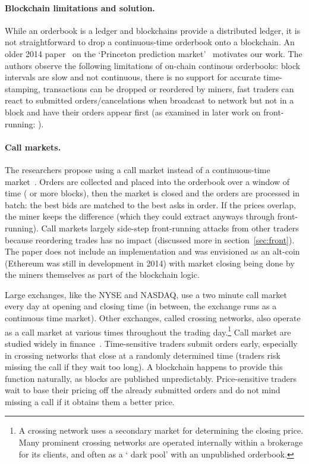\paragraph{Blockchain limitations and solution.} While an orderbook is a ledger and blockchains provide a distributed ledger, it is not straightforward to drop a continuous-time orderbook onto a blockchain. An older 2014 paper~\cite{clark2014decentralizing} on the `Princeton prediction market'~\cite{Bra13} motivates our work. The authors observe the following limitations of on-chain continous orderbooks: block intervals are slow and not continuous, there is no support for accurate time-stamping, transactions can be dropped or reordered by miners, fast traders can react to submitted orders/cancelations when broadcast to network but not in a block and have their orders appear first (as examined in later work on front-running: \cite{eskandari2019sok,daian2019flash}).

\paragraph{Call markets.} The researchers propose using a call market instead of a continuous-time market~\cite{clark2014decentralizing}. Orders are collected and placed into the orderbook over a window of time ( or more blocks), then the market is closed and the orders are processed in batch: the best bids are matched to the best asks in order. If the prices overlap, the miner keeps the difference (which they could extract anyways through front-running). Call markets largely side-step front-running attacks from other traders because reordering trades has no impact (discussed more in section~\ref{sec:front}). The paper does not include an implementation and was envisioned as an alt-coin (Ethereum was still in development in 2014) with market closing being done by the miners themselves as part of the blockchain logic.

Large exchanges, like the NYSE and NASDAQ, use a two minute call market every day at opening and closing time (in between, the exchange runs as a continuous time market). Other exchanges, called crossing networks, also operate as a call market at various times throughout the trading day.\footnote{A crossing network uses a secondary market for determining the closing price. Many prominent crossing networks are operated internally within a brokerage for its clients, and often as a `	dark pool' with an unpublished orderbook.} Call market are studied widely in finance~\cite{Har03}. Time-sensitive traders submit orders early, especially in crossing networks that close at a randomly determined time (traders risk missing the call if they wait too long). A blockchain happens to provide this function naturally, as blocks are published unpredictably. Price-sensitive traders wait to base their pricing off the already submitted orders and do not mind missing a call if it obtains them a better price. 


